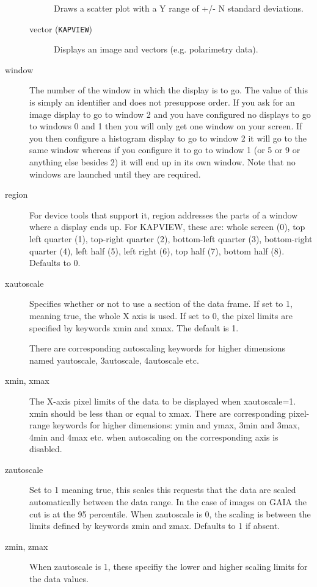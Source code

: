 \documentclass[twoside,11pt]{article}
\renewcommand{\_}{\texttt{\symbol{95}}}
\begin{document}
\begin{description}
\begin{description}
Draws a scatter plot with a Y range of +/- N standard deviations.

\item[vector (\texttt{KAPVIEW})] \mbox{}

Displays an image and vectors (e.g. polarimetry data).

\end{description}
\item[window] \mbox{}

The number of the window in which the display is to go. The value of
this is simply an identifier and does not presuppose order. If you ask 
for an image display to go to window 2 and you have configured no
displays to go to windows 0 and 1 then you will only get one window on 
your screen. If you then configure a histogram display to go to window 
2 it will go to the same window whereas if you configure it to go to
window 1 (or 5 or 9 or anything else besides 2) it will end up in its
own window. Note that no windows are launched until they are
required.

\item[region] \mbox{}

For device tools that support it, region addresses the parts of a
window where a display ends up. For KAPVIEW, these are: whole screen
(0), top left quarter (1), top-right quarter (2), bottom-left quarter
(3), bottom-right quarter (4), left half (5), left right (6), top half 
(7), bottom half (8).  Defaults to 0.

\item[xautoscale] \mbox{}

Specifies whether or not to use a section of the data frame.  If set to
1, meaning true, the whole X axis is used.  If set to 0, the pixel limits
are specified by keywords xmin and xmax.  The default is 1.



There are corresponding autoscaling keywords for higher dimensions
named yautoscale, 3autoscale, 4autoscale etc.

\item[xmin, xmax] \mbox{}

The X-axis pixel limits of the data to be displayed when xautoscale=1.
xmin should be less than or equal to xmax.  There are corresponding
pixel-range keywords for higher dimensions: ymin and ymax, 3min and
3max, 4min and 4max etc. when autoscaling on the corresponding axis is
disabled.

\item[zautoscale] \mbox{}

Set to 1 meaning true, this scales this requests that the data are
scaled automatically between the data range.  In the case of images on
GAIA the cut is at the 95 percentile.  When zautoscale is 0, the
scaling is between the limits defined by keywords zmin and zmax.
Defaults to 1 if absent.

\item[zmin, zmax] \mbox{}

When zautoscale is 1, these specifiy the lower and higher 
scaling limits for the data values.

\end{description}
\end{document}
